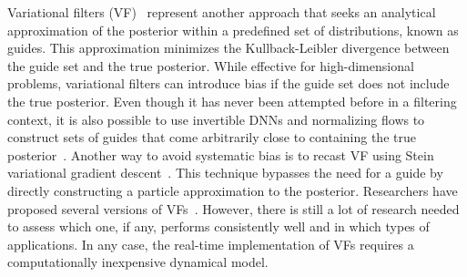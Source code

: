 
Variational filters (VF)~\cite{Jordan1999, Blei2017} represent another approach that seeks an analytical approximation of the posterior within a predefined set of distributions, known as guides. 
This approximation minimizes the Kullback-Leibler divergence between the guide set and the true posterior. 
While effective for high-dimensional problems, variational filters can introduce bias if the guide set does not include the true posterior. 
Even though it has never been attempted before in a filtering context, it is also possible to use invertible DNNs and normalizing flows to construct sets of guides that come arbitrarily close to containing the true posterior~\cite{ardizzone2018analyzing}.
Another way to avoid systematic bias is to recast VF using Stein variational gradient descent~\cite{Liu2016, Liu2017}. 
This technique bypasses the need for a guide by directly constructing a particle approximation to the posterior.
Researchers have proposed several versions of VFs~\cite{Sun2012, Salimans2014, Kim2019, Broderick2013, Lund2020VariationalIF}. 
However, there is still a lot of research needed to assess which one, if any, performs consistently well and in which types of applications.
In any case, the real-time implementation of VFs requires a computationally inexpensive dynamical model.

